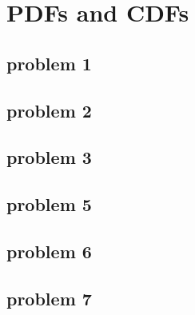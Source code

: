 \section{PDFs and CDFs}

\subsection{problem 1}

\subsection{problem 2}

\subsection{problem 3}

\subsection{problem 5}

\subsection{problem 6}

\subsection{problem 7}

